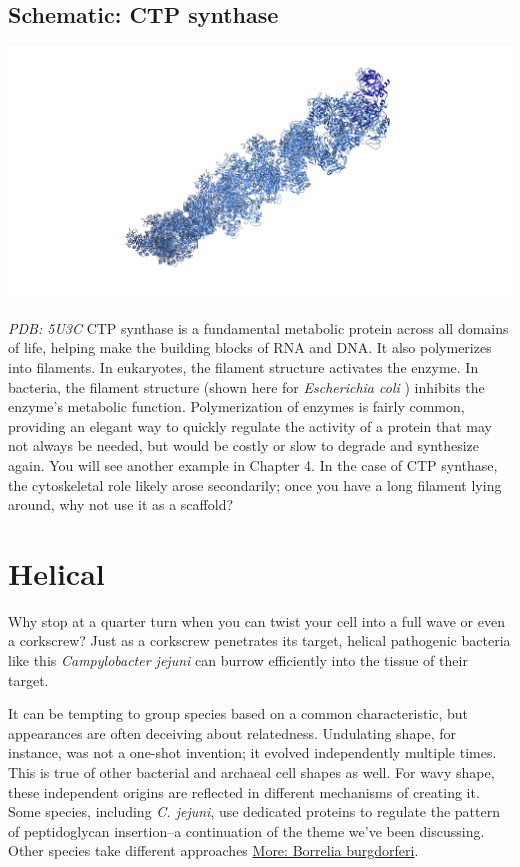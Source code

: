 \documentclass[]{tufte-book}
\begin{document}
\hypertarget{CTP_synthase}{\subsection*{Schematic: CTP
synthase}\label{CTP_synthase}}

\includegraphics{img/schematics/3_4_1}

\emph{PDB: 5U3C} CTP synthase is a fundamental metabolic protein across
all domains of life, helping make the building blocks of RNA and DNA. It
also polymerizes into filaments. In eukaryotes, the filament structure
activates the enzyme. In bacteria, the filament structure (shown here
for \emph{Escherichia coli} \citep{lynch2017}) inhibits the enzyme's
metabolic function. Polymerization of enzymes is fairly common,
providing an elegant way to quickly regulate the activity of a protein
that may not always be needed, but would be costly or slow to degrade
and synthesize again. You will see another example in Chapter 4. In the
case of CTP synthase, the cytoskeletal role likely arose secondarily;
once you have a long filament lying around, why not use it as a
scaffold?

\section{Helical}\label{helical}

Why stop at a quarter turn when you can twist your cell into a full wave
or even a corkscrew? Just as a corkscrew penetrates its target, helical
pathogenic bacteria like this \emph{Campylobacter jejuni} can burrow
efficiently into the tissue of their target.

It can be tempting to group species based on a common characteristic,
but appearances are often deceiving about relatedness. Undulating shape,
for instance, was not a one-shot invention; it evolved independently
multiple times. This is true of other bacterial and archaeal cell shapes
as well. For wavy shape, these independent origins are reflected in
different mechanisms of creating it. Some species, including \emph{C.
jejuni}, use dedicated proteins to regulate the pattern of peptidoglycan
insertion--a continuation of the theme we've been discussing. Other
species take different approaches
\protect\hyperlink{Borrelia_burgdorferi}{More: Borrelia burgdorferi}.
\end{document}
